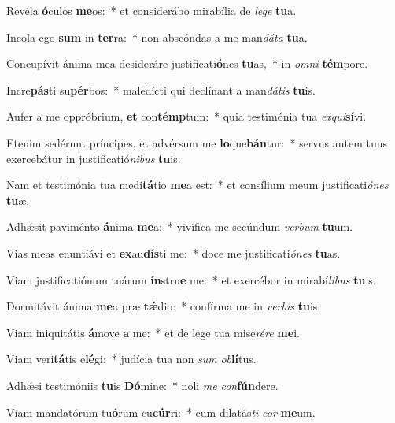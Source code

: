 \item Revéla \textbf{ó}culos \textbf{me}os:~* et considerábo mirabília de \textit{le}\textit{ge} \textbf{tu}a.
\item Incola ego \textbf{sum} in \textbf{ter}ra:~* non abscóndas a me man\textit{dá}\textit{ta} \textbf{tu}a.
\item Concupívit ánima mea desideráre justificati\textbf{ó}nes \textbf{tu}as,~* in \textit{om}\textit{ni} \textbf{tém}pore.
\item Incre\textbf{pás}ti su\textbf{pér}bos:~* maledícti qui declínant a man\textit{dá}\textit{tis} \textbf{tu}is.
\item Aufer a me oppróbrium, \textbf{et} con\textbf{témp}tum:~* quia testimónia tua \textit{ex}\textit{qui}\textbf{sí}vi.
\item Etenim sedérunt príncipes, et advérsum me \textbf{lo}que\textbf{bán}tur:~* servus autem tuus exercebátur in justificatió\textit{ni}\textit{bus} \textbf{tu}is.
\item Nam et testimónia tua medi\textbf{tá}tio \textbf{me}a est:~* et consílium meum justificati\textit{ó}\textit{nes} \textbf{tu}æ.
\item Adhǽsit paviménto \textbf{á}nima \textbf{me}a:~* vivífica me secúndum \textit{ver}\textit{bum} \textbf{tu}um.
\item Vias meas enuntiávi et \textbf{ex}au\textbf{dís}ti me:~* doce me justificati\textit{ó}\textit{nes} \textbf{tu}as.
\item Viam justificatiónum tuárum \textbf{ín}stru\textbf{e} me:~* et exercébor in mirabí\textit{li}\textit{bus} \textbf{tu}is.
\item Dormitávit ánima \textbf{me}a præ \textbf{tǽ}dio:~* confírma me in \textit{ver}\textit{bis} \textbf{tu}is.
\item Viam iniquitátis \textbf{á}move \textbf{a} me:~* et de lege tua mise\textit{ré}\textit{re} \textbf{me}i.
\item Viam veri\textbf{tá}tis e\textbf{lé}gi:~* judícia tua non \textit{sum} \textit{ob}\textbf{lí}tus.
\item Adhǽsi testimóniis \textbf{tu}is \textbf{Dó}mine:~* noli \textit{me} \textit{con}\textbf{fún}dere.
\item Viam mandatórum tu\textbf{ó}rum cu\textbf{cúr}ri:~* cum dilatás\textit{ti} \textit{cor} \textbf{me}um.
